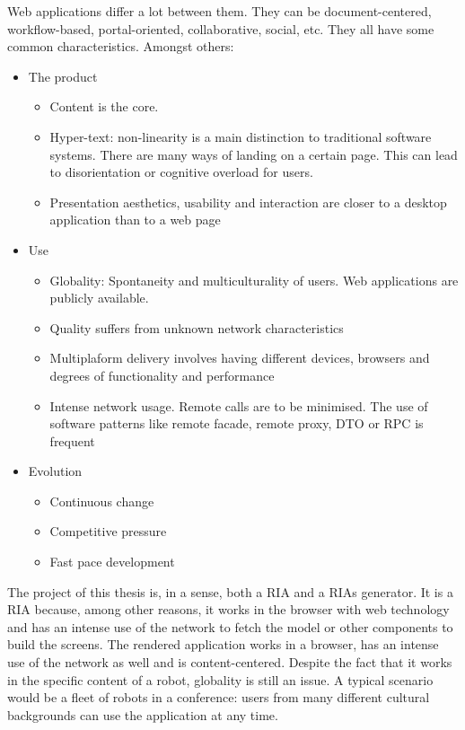 Web applications differ a lot between them. 
They can be document-centered, workflow-based, portal-oriented, collaborative, social, etc. 
They all have some common characteristics. Amongst others:
\begin{itemize}
    \item The product
    \begin{itemize}
        \item Content is the core.
        \item Hyper-text: non-linearity is a main distinction to traditional software systems. There are many ways of landing on a certain page. This can lead to disorientation or cognitive overload for users.
        \item Presentation aesthetics, usability and interaction are closer to a desktop application than to a web page
    \end{itemize}
    \item Use
    \begin{itemize}
        \item Globality: Spontaneity and multiculturality of users. Web applications are publicly available.
        \item Quality suffers from unknown network characteristics
        \item Multiplaform delivery involves having different devices, browsers and degrees of functionality and performance
        \item Intense network usage. Remote calls are to be minimised. The use of software patterns like remote facade, remote proxy, DTO or RPC is frequent
    \end{itemize}
    \item Evolution
    \begin{itemize}
         \item Continuous change
         \item Competitive pressure
         \item Fast pace development
    \end{itemize}   
\end{itemize}

The project of this thesis is, in a sense, both a \ac{RIA} and a \acp{RIA} generator. 
It is a \ac{RIA} because, among other reasons, it works in the browser with web technology and has an intense use of the network to fetch the model or other components to build the screens.
The rendered application works in a browser, has an intense use of the network as well and is content-centered.
Despite the fact that it works in the specific content of a robot, globality is still an issue. A typical scenario would be a fleet of robots in a conference: users from many different cultural backgrounds can use the application at any time.



